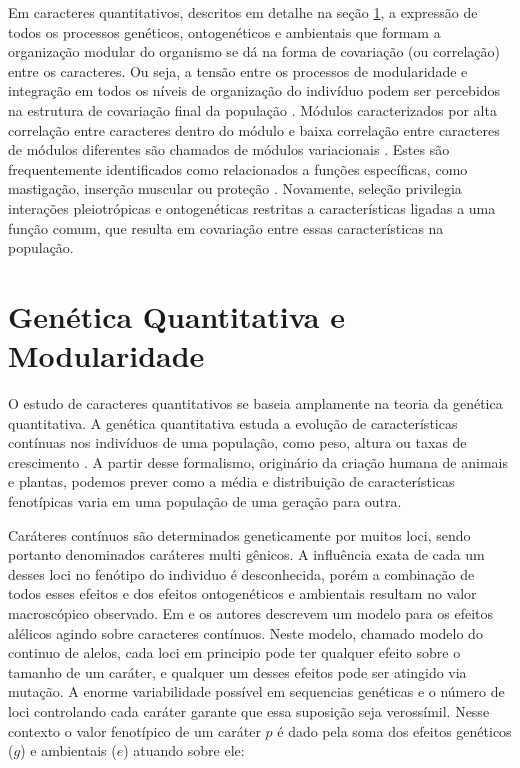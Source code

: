 Em caracteres quantitativos, descritos em detalhe na seção
\ref{intro:genquant}, a expressão de todos os processos genéticos,
ontogenéticos e ambientais que formam a organização modular do organismo se
dá na forma de covariação (ou correlação) entre os caracteres.
Ou seja, a tensão entre os processos de modularidade e integração em todos os
níveis de organização do indivíduo podem ser percebidos na estrutura de
covariação final da população \citep{Klingenberg2008}.
Módulos caracterizados por alta correlação entre caracteres dentro do
módulo e baixa correlação entre caracteres de módulos diferentes são
chamados de módulos variacionais \citep{Wagner2007}.
Estes são frequentemente identificados como relacionados a funções
específicas, como mastigação, inserção muscular ou proteção
\citep{Cheverud1997}. 
Novamente, seleção privilegia interações pleiotrópicas e ontogenéticas restritas
a características ligadas a uma função comum, que resulta em
covariação entre essas características na população.


\section{Genética Quantitativa e Modularidade}\label{intro:genquant}

O estudo de caracteres quantitativos se baseia amplamente na teoria da
genética quantitativa. 
A genética quantitativa estuda a evolução de características contínuas
nos indivíduos de uma população, como peso, altura ou taxas de
crescimento \citep{Falconer1996}.
A partir desse formalismo, originário da criação humana de animais e plantas, 
podemos prever como a média e distribuição de
características fenotípicas varia em uma população de uma geração para
outra.

Caráteres contínuos são determinados geneticamente por muitos loci,
sendo portanto denominados caráteres multi gênicos.
A influência exata de cada um desses loci no fenótipo do individuo é
desconhecida, porém a combinação de todos esses efeitos e dos efeitos
ontogenéticos e ambientais resultam no valor macroscópico observado.
Em \cite{Crow1964} e \cite{Kimura1965} os autores descrevem um modelo
para os efeitos alélicos agindo sobre caracteres contínuos.
Neste modelo, chamado modelo do continuo de alelos, cada loci em
principio pode ter qualquer efeito sobre o tamanho de um caráter, e
qualquer um desses efeitos pode ser atingido via mutação.
A enorme variabilidade possível em sequencias genéticas e o número de
loci controlando cada caráter garante que essa suposição seja verossímil.
Nesse contexto o valor fenotípico de um caráter $p$ é dado pela soma dos
efeitos genéticos ($g$) e ambientais ($e$) atuando sobre ele:

